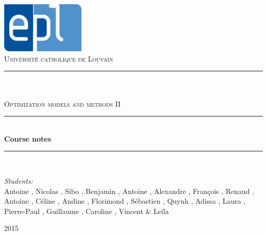 \newcommand{\HRule}{\rule{\linewidth}{0.5mm}}

\begin{titlepage}
	
\begin{center}

\includegraphics[width=0.30\textwidth]{images/epl.jpg}\\[1cm]    

\textsc{\LARGE Universit\'e catholique de Louvain}\\[1.5cm]

\HRule \\[0.5cm]

\textsc{\Large {}}\\[0.2cm]
\textsc{\Large Optimization models and methods II}\\[0.5cm]


\HRule \\[2cm]
{\huge \bfseries Course notes}\\[1cm]

\HRule \\[1.5cm]

\begin{minipage}{0.8\textwidth}
\large
\emph{Students:}\\
Antoine , Nicolas , Sibo , Benjamin , Antoine , Alexandre , François , Renaud , Antoine , Céline , Andine , Florimond , Sébastien , Quynh , Adissa , Laura , Pierre-Paul , Guillaume , Caroline , Vincent   \& Leïla 
\end{minipage}





\vfill

{\large  2015}

\end{center}	
	
	
\end{titlepage}
